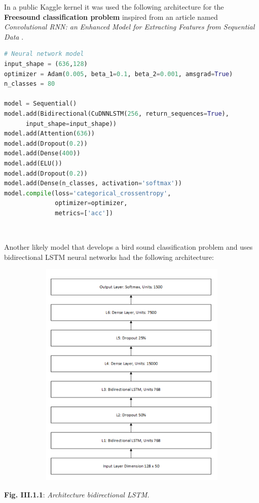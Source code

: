 \documentclass[11pt, a4papper]{report}
\theoremstyle{plain}
\theoremstyle{definition}
\theoremstyle{definition}
\theoremstyle{proposition}
\begin{document}
In a public Kaggle kernel  \cite{8} it was used the following architecture for the \textbf{Freesound classification problem} inspired from an article named \textit{Convolutional RNN: an Enhanced Model for
Extracting Features from Sequential Data} \cite{11}.

\begin{lstlisting}[language=Python]
# Neural network model
input_shape = (636,128)
optimizer = Adam(0.005, beta_1=0.1, beta_2=0.001, amsgrad=True)
n_classes = 80

model = Sequential()
model.add(Bidirectional(CuDNNLSTM(256, return_sequences=True),
	  input_shape=input_shape))
model.add(Attention(636))
model.add(Dropout(0.2))
model.add(Dense(400))
model.add(ELU())
model.add(Dropout(0.2)) 
model.add(Dense(n_classes, activation='softmax'))
model.compile(loss='categorical_crossentropy',
              optimizer=optimizer,
              metrics=['acc'])
\end{lstlisting}
\

Another likely model that develops a bird sound classification problem and uses bidirectional
LSTM neural networks had the following architecture:
\begin{center}
\includegraphics[width=16cm,height=11cm,keepaspectratio]{architecture-bidirect-LSTM}
\end{center}
\begin{center}
\textbf{Fig. III.1.1}: \textit{Architecture bidirectional LSTM. \cite{10}}
\end{center}
\end{document}

